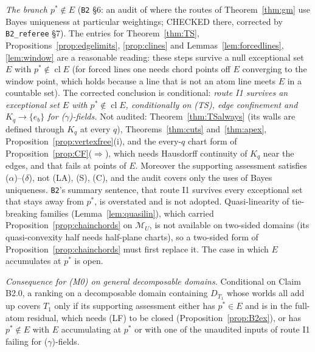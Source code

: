 \documentclass[11pt]{article}
\theoremstyle{definition}
\theoremstyle{remark}
\newcommand{\M}{\mathcal M}
\newcommand{\cl}{\operatorname{cl}}
\newcommand{\src}[1]{\texttt{#1}}
\begin{document}
\emph{The branch $p^*\notin E$} (\src{B2} \S6: an audit of where the routes of Theorem~\ref{thm:gm} use Bayes uniqueness at particular weightings; CHECKED there, corrected by \src{B2\_referee} \S7). The entries for Theorem~\ref{thm:TS}, Propositions~\ref{prop:edgelimits}, \ref{prop:clines} and Lemmas~\ref{lem:forcedlines}, \ref{lem:window} are a reasonable reading: these steps survive a null exceptional set $E$ with $p^*\notin\cl E$ (for forced lines one needs chord points off $E$ converging to the window point, which holds because a line that is not an atom line meets $E$ in a countable set). The corrected conclusion is conditional: \emph{route I1 survives an exceptional set $E$ with $p^*\notin\cl E$, conditionally on (TS), edge confinement and $K_q\to\{e_b\}$ for ($\gamma$)-fields.} Not audited: Theorem~\ref{thm:TSalways} (its walls are defined through $K_q$ at every $q$), Theorems~\ref{thm:cuts} and~\ref{thm:apex}, Proposition~\ref{prop:vertexfree}(i), and the every-$q$ chart form of Proposition~\ref{prop:CF}($\Rightarrow$), which needs Hausdorff continuity of $K_q$ near the edges, and that fails at points of $E$. Moreover the supporting assessment satisfies ($\alpha$)--($\delta$), not (LA), (S), (C), and the audit covers only the uses of Bayes uniqueness. \src{B2}'s summary sentence, that route I1 survives every exceptional set that stays away from $p^*$, is overstated and is not adopted. Quasi-linearity of tie-breaking families (Lemma~\ref{lem:quasilin}), which carried Proposition~\ref{prop:chainchords} on $\M_U$, is not available on two-sided domains (its quasi-convexity half needs half-plane charts), so a two-sided form of Proposition~\ref{prop:chainchords} must first replace it. The case in which $E$ accumulates at $p^*$ is open.

\emph{Consequence for (M0) on general decomposable domains.} Conditional on Claim B2.0, a ranking on a decomposable domain containing $D_{T_1}$ whose worlds all add up covers $T_1$ only if its supporting assessment either has $p^*\in E$ and is in the full-atom residual, which needs (LF) to be closed (Proposition~\ref{prop:B2ex}), or has $p^*\notin E$ with $E$ accumulating at $p^*$ or with one of the unaudited inputs of route I1 failing for ($\gamma$)-fields.
\end{document}
